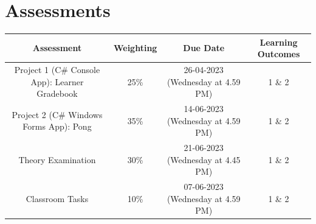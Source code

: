 \documentclass{article}
\begin{document}
\section*{Assessments}
\renewcommand{\arraystretch}{1.5}
\begin{tabular}{|c|c|c|c|}
	\hline
	\textbf{Assessment}                                 & \textbf{Weighting} & \textbf{Due Date}            & \textbf{Learning Outcomes} \\ \hline
	\small Project 1 (C\# Console App): Learner Gradebook  & \small 25\%        & \small 26-04-2023 (Wednesday at 4.59 PM)   & \small 1 \& 2                   \\ \hline
	\small Project 2 (C\# Windows Forms App): Pong & \small 35\%        & \small 14-06-2023 (Wednesday at 4.59 PM)   & \small 1 \& 2                   \\ \hline
	\small Theory Examination                        & \small 30\%        & \small 21-06-2023 (Wednesday at 4.45 PM)  & \small 1 \& 2                   \\ \hline
	\small Classroom Tasks                       & \small 10\%        & \small 07-06-2023 (Wednesday at 4.59 PM)  & \small 1 \& 2                   \\ \hline
\end{tabular} 
\end{document}
